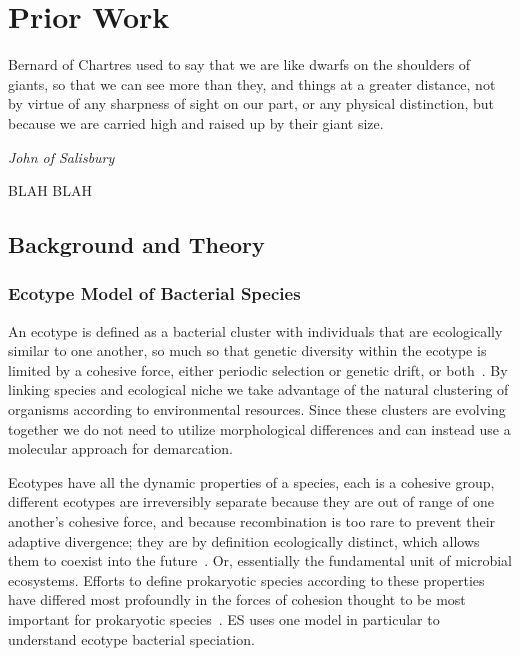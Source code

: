 \chapter{Prior Work}


\begin{shadequote}
Bernard of Chartres used to say that we are like dwarfs on the shoulders of giants, so that we can see more than they, and things at a greater distance, not by virtue of any sharpness of sight on our part, or any physical distinction, but because we are carried high and raised up by their giant size.\par\emph{John of Salisbury}
\end{shadequote}

BLAH BLAH

\section{Background and Theory}
\subsection*{Ecotype Model of Bacterial Species}
An ecotype is defined as a bacterial cluster with individuals that are ecologically similar to one another, so much so that genetic diversity within the ecotype is limited by a cohesive force, either periodic selection or genetic drift, or both~\cite{cohan2007systematics}.
By linking species and ecological niche we take advantage of the natural clustering of organisms according to environmental resources.
Since these clusters are evolving together we do not need to utilize morphological differences and can instead use a molecular approach for demarcation.

Ecotypes have all the dynamic properties of a species, each is a cohesive group, different ecotypes are irreversibly separate because they are out of range of one another's cohesive force, and because recombination is too rare to prevent their adaptive divergence; they are by definition ecologically distinct, which allows them to coexist into the future~\cite{cohan2007systematics}.
Or, essentially the fundamental unit of microbial ecosystems.
Efforts to define prokaryotic species according to these properties have differed most profoundly in the forces of cohesion thought to be most important for prokaryotic species~\cite{cohan2008origins}.
ES uses one model in particular to understand ecotype bacterial speciation.

